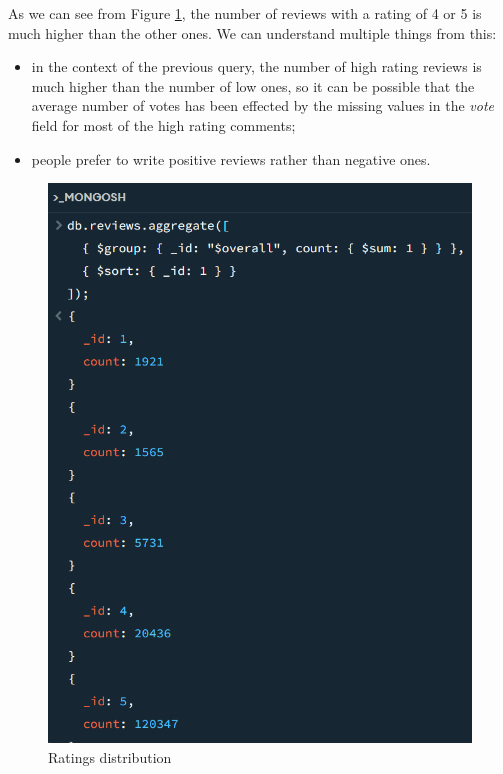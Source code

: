 As we can see from Figure \ref{fig:q8_result_spec}, the number of reviews with a rating of 4 or 5 is much higher than the other ones.
We can understand multiple things from this:
\begin{itemize}
    \item in the context of the previous query, the number of high rating reviews is much higher than the number of low ones, so it can be possible that the average number of votes has been effected by the missing values in the \textit{vote} field for most of the high rating comments;
    \item people prefer to write positive reviews rather than negative ones.
\end{itemize}
\begin{figure}[H]
  \centering
  \includegraphics[scale=0.6]{Images/q8_result_spec.png}
  \caption{Ratings distribution}
  \label{fig:q8_result_spec}
\end{figure}

